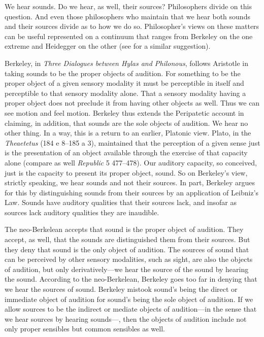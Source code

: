 We hear sounds. Do we hear, as well, their sources? Philosophers divide on this question. And even those philosophers who maintain that we hear both sounds and their sources divide as to how we do so. Philosopher's views on these matters can be useful represented on a continuum that ranges from Berkeley on the one extreme and Heidegger on the other (see \citealt{Leddington:2014aa} for a similar suggestion). 

\nocite{Berkeley:1734fk} Berkeley, in \emph{Three Dialogues between Hylas and Philonous}, follows Aristotle in taking sounds to be the proper objects of audition. For something to be the proper object of a given sensory modality it must be perceptible in itself and perceptible to that sensory modality alone. That a sensory modality having a proper object does not preclude it from having other objects as well. Thus we can see motion and feel motion. Berkeley thus extends the Peripatetic account in claiming, in addition, that sounds are the sole objects of audition. We hear no other thing. In a way, this is a return to an earlier, Platonic view. Plato, in the \emph{Theaetetus} (184 e 8--185 a 3), maintained that the perception of a given sense just is the presentation of an object available through the exercise of that capacity alone (compare as well \emph{Republic} 5 477--478). Our auditory capacity, so conceived, just is the capacity to present its proper object, sound. So on Berkeley's view, strictly speaking, we hear sounds and not their sources. In part, Berkeley argues for this by distinguishing sounds from their sources by an application of Leibniz's Law. Sounds have auditory qualities that their sources lack, and insofar as sources lack auditory qualities they are inaudible. 


The neo-Berkelean accepts that sound is the proper object of audition. They accept, as well, that the sounds are distinguished them from their sources. But they deny that sound is the only object of audition. The sources of sound that can be perceived by other sensory modalities, such as sight, are also the objects of audition, but only derivatively---we hear the source of the sound by hearing the sound. According to the neo-Berkelean, Berkeley goes too far in denying that we hear the sources of sound. Berkeley mistook sound's being the direct or immediate object of audition for sound's being the sole object of audition. If we allow sources to be the indirect or mediate objects of audition---in the sense that we hear sources by hearing sounds---, then the objects of audition include not only proper sensibles but common sensibles as well.


